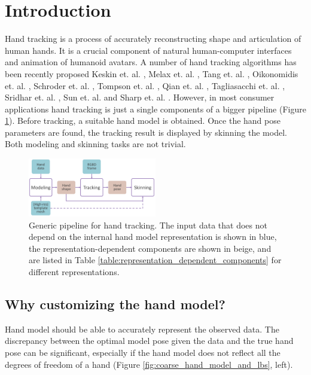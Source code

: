 \section{Introduction}

Hand tracking is a process of accurately reconstructing shape and articulation of human hands. It is a crucial component of natural human-computer interfaces and animation of humanoid avatars. A number of hand tracking algorithms has been recently proposed  Keskin et. al. \cite{keskin2012hand}, Melax et. al. \cite{melax2013dynamics}, Tang et. al. \cite{tang2013real}, Oikonomidis et. al. \cite{oikonomidis2014evolutionary}, Schroder et. al. \cite{schroder2014real},
Tompson et. al. \cite{tompson2014real}, Qian et. al. \cite{qian2014realtime},  Tagliasacchi et. al. \cite{tagliasacchi2015robust}, Sridhar et. al. \cite{sridhar2015fast}, Sun et. al. \cite{sun2015cascaded} and Sharp et. al. \cite{sharp2015accurate}.
However, in most consumer applications hand tracking is just a single components of a bigger pipeline (Figure \ref{fig:generic_pipeline}). Before tracking, a suitable hand model is obtained. Once the hand pose parameters are found, the tracking result is displayed by skinning the model. Both modeling and skinning tasks are not trivial.

\begin{figure}[h!] 
	\centering
	\includegraphics[width=0.5\textwidth]{fig/generic_pipeline}
	\caption{Generic pipeline for hand tracking. The input data that does not depend on the internal hand model representation is shown in blue, the representation-dependent components are shown in beige, and are listed in Table \ref{table:representation_dependent_components} for different representations.}
	\label{fig:generic_pipeline}
\end{figure}


\subsection{Why customizing the hand model?}

Hand model should be able to accurately represent the observed data.  The discrepancy between the optimal model pose given the data and the true hand pose can be significant, especially if the hand model does not reflect all the degrees of freedom of a hand (Figure \ref{fig:coarse_hand_model_and_lbs}, left).


